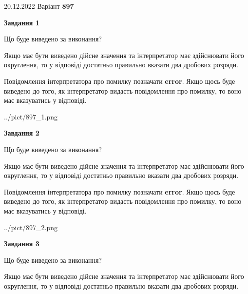 \documentclass[12pt, ukrainian]{article}
\begin{document}
{20.12.2022 Варіант \No \textbf { 897 }\par}
{
\begin {Large}

{\begin {center}\textbf{Завдання 1}\end {center}}\par
Що буде виведено за виконання? \par

Якщо має бути виведено дійсне значення та інтерпретатор має здійснювати його округлення, 
то у відповіді достатньо правильно вказати два дробових розряди.

Повідомлення інтерпретатора про помилку позначати \textbf{error}.
Якщо щось буде виведено до того, як інтерпретатор видасть повідомлення про помилку, 
то воно має вказуватись у відповіді. \par

\begin{center}
	{../pict/897_1.png}
\end{center}
\newpage

{\begin {center}\textbf{Завдання 2}\end {center}}\par
Що буде виведено за виконання? \par

Якщо має бути виведено дійсне значення та інтерпретатор має здійснювати його округлення, 
то у відповіді достатньо правильно вказати два дробових розряди.

Повідомлення інтерпретатора про помилку позначати \textbf{error}.
Якщо щось буде виведено до того, як інтерпретатор видасть повідомлення про помилку, 
то воно має вказуватись у відповіді. \par

\begin{center}
	{../pict/897_2.png}
\end{center}
\newpage

{\begin {center}\textbf{Завдання 3}\end {center}}\par
Що буде виведено за виконання? \par

Якщо має бути виведено дійсне значення та інтерпретатор має здійснювати його округлення, 
то у відповіді достатньо правильно вказати два дробових розряди.


\end{Large}}
\end{document}

